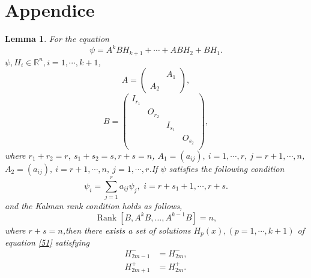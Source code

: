 \documentclass[a4paper,reqno,11pt]{amsart}
\numberwithin{equation}{section} %
\newtheorem{lem}{Lemma}[section]
\begin{document}
\section{Appendice}
\begin{lem}\label{l50}
	For the equation
	\begin{equation}\label{51}
		\psi =A^kBH_{k+1} +\cdots +ABH_2 +BH_1.
	\end{equation}
	$\psi , H_i \in \mathbb{R} ^n ,i = 1,\cdots,k+1$,
	$$
	A=\left(\begin{array}{ll} 
		& A_1 \\
		A_2 &
	\end{array}\right),
	$$
	$$
	B=\left( \begin{matrix}
		I_{r_1}&		&		&		\\
		&		O_{r_2}&		&		\\
		&		&		I_{s_1}&		\\
		&		&		&		O_{s_2}\\
	\end{matrix} \right) ,
	$$
	where $r_1 +r_2 =r,\ s_1+s_2=s, r+s=n $, $A_1=\left( a_{ij} \right) ,\ i=1,\cdots ,r,\ j=r+1,\cdots ,n$, $A_2=\left( a_{ij} \right) ,\ i=r+1,\cdots ,n,\ j=1,\cdots ,r$.If $\psi$ satisfies the following condition
	\begin{equation}\label{52}
		\psi _i=\sum_{j=1}^r{a_{ij}\psi _j ,\,\,i=r+s_1+1,\cdots ,r+s.}
	\end{equation}
	and the Kalman rank condition holds as follows,
	\begin{equation}\label{53}
		\operatorname{Rank}\left[B, A^k B, \ldots, A^{k-1} B\right]=n,
	\end{equation}
	where $r+s=n$,then there exists a set of solutions $H_p (x), (p = 1, \cdots , k+1)$ of equation \eqref{51} satisfying
	\begin{align}
		H^{-}_{2m-1} &= H^{-}_{2m}\label{55} ,\\
		H^{+}_{2m+1} &= H^{+}_{2m}\label{56} .
	\end{align}
\end{lem}
\end{document}
